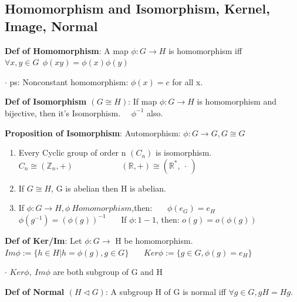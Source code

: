 \documentclass[11pt]{article}
\begin{document}
\subsection{Homomorphism and Isomorphism, Kernel, Image, Normal}

\textbf{Def of Homomorphism}: A map $\phi:G\to H$ is homomorphism iff $\forall x,y\in G \ \ \phi(xy)=\phi(x)\phi(y)$

$\cdot$ ps: Nonconstant homomorphism: $\phi(x)=c$ for all x.

\textbf{Def of Isomorphism $(G\cong H)$}: If map $\phi:G\to H$ is homomorphism and bijective, then it's Isomorphism. \ \ $\phi^{-1}$ also.

\textbf{Proposition of Isomorphism}: Automorphism: $\phi:G\to G,G\cong G$
\begin{enumerate}[itemsep=-2pt, topsep=-2pt]
    \item Every Cyclic group of order n $(C_n)$ is isomorphism. \ \ \ \ \ \ \ \ \ \ \ $C_n \cong (\mathbb{Z}_n,+)$ \ \ \ \ \ \ \ \ \ \ \ $(\mathbb{R},+)\cong(\mathbb{R^*},\ \cdot \ )$
    \item If $G\cong H$, G is abelian then H is abelian.
    \item If $\phi:G\to H,\phi \ Homomorphism$,then: \ \ \ $\phi(e_G)=e_H$ \ \ \ $\phi(g^{-1})=(\phi(g))^{-1}$ \ \ \ If $\phi:1-1$, then: $o(g)=o(\phi(g))$
\end{enumerate}

\textbf{Def of Ker/Im}: Let $\phi:G\to$ H be homomorphism. \ \ \ $Im \phi := \{h\in H | h=\phi(g),g\in G\}$ \ \ \ $Ker \phi:= \{g\in G,\phi(g)=e_H\}$

$\cdot$ $Ker\phi, \ Im\phi$ are both subgroup of G and H

\textbf{Def of Normal $(H\lhd G)$}: A subgroup H of G is normal iff $\forall g\in G,gH=Hg$.
\end{document}
